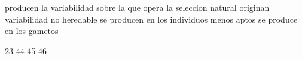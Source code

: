 \documentclass[10pt,a4paper]{article}
\begin{document}
\begin{multicols*}{2}
				
				{producen la variabilidad sobre la que opera la seleccion natural}
				{originan variabilidad no heredable}
				{se producen en los individuos menos aptos}
				{se produce en los gametos}
				
				
				{23}
				{44}
				{45}
				{46}
				
				
				
				
				
	\end{multicols*}
	
\end{document}
